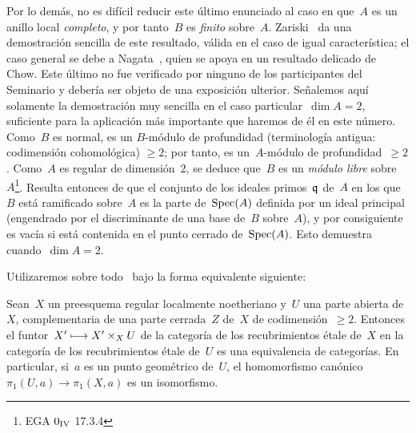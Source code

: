 Por lo demás, no es difícil reducir este último enunciado al caso en que~$A$
es un anillo local \emph{completo}, y por tanto~$B$ es \emph{finito} sobre~$A$.
Zariski~\cite{X.5} da una demostración sencilla de este resultado, válida en
el caso de igual característica; el caso general se debe a
Nagata~\cite{X.3}, quien se apoya en un resultado delicado de Chow. Este último
no fue verificado por ninguno de los participantes del Seminario y debería ser
objeto de una exposición ulterior. Señalemos aquí solamente la demostración muy
sencilla en el caso particular~$\dim A=2$, suficiente para la aplicación más
importante que haremos de él en este número. Como~$B$ es normal, es un
$B$-módulo de profundidad (terminología antigua: codimensión cohomológica)
$\ge 2$; por tanto, es un~$A$-módulo de profundidad~$\ge 2$. Como~$A$ es
regular de dimensión~$2$, se deduce que~$B$ es un \emph{módulo libre}
sobre~$A$\kern1pt\footnote{\Cf EGA $0_{\textup{IV}}$ 17.3.4}. Resulta entonces
de  que el conjunto de los ideales primos~$\mathfrak{q}$ de~$A$ en
los que~$B$ está ramificado sobre~$A$ es la parte de~$\operatorname{Spec}(A)$ definida por un
ideal principal (engendrado por el discriminante de una base de~$B$ sobre~$A$),
y por consiguiente es vacía si está contenida en el punto cerrado de~$\operatorname{Spec}(A)$.
Esto demuestra~ cuando~$\dim A=2$.

Utilizaremos sobre todo~ bajo la forma equivalente siguiente:

\begin{corollaire}
\label{X.3.3}
Sean~$X$ un preesquema regular localmente noetheriano y~$U$ una parte abierta
de~$X$, complementaria de una parte cerrada~$Z$ de~$X$ de
codimensión~$\ge 2$. Entonces el funtor~$X'\longmapsto X'\times_XU$ de la categoría
de los recubrimientos étale de~$X$ en la categoría de los recubrimientos
étale de~$U$ es una equivalencia
de categorías. En particular, si~$a$ es un punto geométrico de~$U$, el
homomorfismo canónico~$\pi_1(U,a)\to\pi_1(X,a)$ es un isomorfismo.
\end{corollaire}

